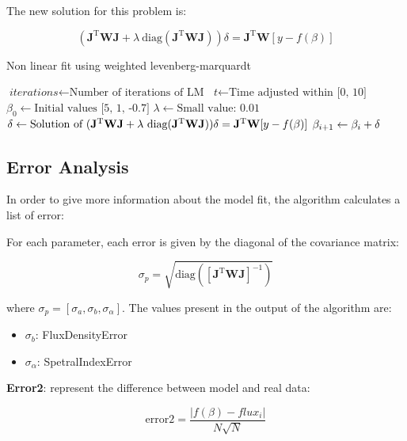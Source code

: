 \documentclass[10pt]{article}
\begin{document}
\noindent The new solution for this problem is:

$$ (\mathbf{J}^{\text{T}}\mathbf{W}\mathbf{J} + \lambda~\text{diag}(\mathbf{J}^{\text{T}}\mathbf{W}\mathbf{J})) \delta = \mathbf{J}^{\text{T}}\mathbf{W}[y - f(\beta)] $$

\begin{algorithm}[H]
\caption{Non linear fit using weighted levenberg-marquardt}\label{4months}
\begin{algorithmic}[1]
\State $\textit{iterations} \gets \text{Number of iterations of LM}$
\Statex
\State $\textit{t} \gets \text{Time adjusted within [0, 10]}$
\Statex
\State $\textit{$\beta_0$} \gets \text{Initial values [5, 1, -0.7]}$
\Statex
\State $\textit{$\lambda$} \gets \text{Small value: 0.01}$
\Statex
{}
\Statex
\State $\textit{$\delta$} \gets \text{Solution of $ (\mathbf{J}^{\text{T}}\mathbf{W}\mathbf{J} + \lambda~\text{diag}(\mathbf{J}^{\text{T}}\mathbf{W}\mathbf{J})) \delta = \mathbf{J}^{\text{T}}\mathbf{W}[y - f(\beta)] $}$
\Statex
\State $\textit{$\beta_{i+1}$} \gets \text{$ \beta_i + \delta $}$
\Statex
\EndFor
\State {}
\EndProcedure
\end{algorithmic}
\end{algorithm}

\subsection{Error Analysis}
In order to give more information about the model fit, the algorithm calculates a list of error:

For each parameter, each error is given by the diagonal of the covariance matrix:

$$ \sigma_p = \sqrt{\text{diag}([\mathbf{J}^{\text{T}}\mathbf{W}\mathbf{J}]^{-1})} $$

\noindent where $\sigma_p = [\sigma_a, \sigma_b, \sigma_{\alpha}]$. The values present in the output of the algorithm are:
\begin{itemize}
    \item $\sigma_b$: FluxDensityError 
    \item $\sigma_{\alpha}$: SpetralIndexError
\end{itemize}

\noindent \textbf{Error2}: represent the difference between model and real data:

$$ \text{error2} = \frac{|f(\beta) - flux_i|}{N\sqrt{N}}  $$
\end{document}
